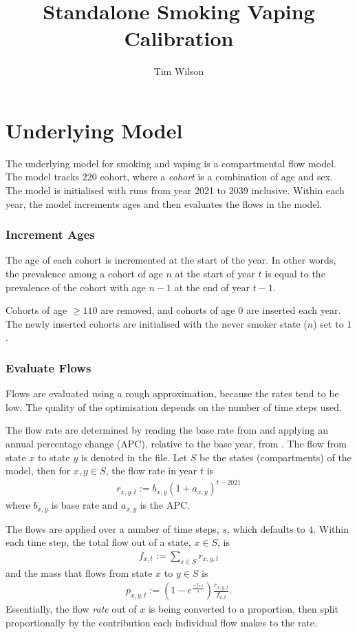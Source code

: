 \documentclass[]{article}
\title{Standalone Smoking Vaping Calibration}
\author{Tim Wilson}
\begin{document}
	
	\maketitle
	
	\section{Underlying Model}
	
	The underlying model for smoking and vaping is a compartmental flow model. The model tracks $220$ cohort, where a \emph{cohort} is a combination of age and sex. The model is initialised with  runs from year 2021 to 2039 inclusive. Within each year, the model increments ages and then evaluates the flows in the model.
	
	\subsubsection{Increment Ages}
	The age of each cohort is incremented at the start of the year. In other words, the prevalence among a cohort of age $n$ at the start of year $t$ is equal to the prevalence of the cohort with age $n-1$ at the end of year $t-1$.
	
	Cohorts of age $\geq 110$ are removed, and cohorts of age $0$ are inserted each year. The newly inserted cohorts are initialised with the never smoker state ($n$) set to $1$.
	
	\subsubsection{Evaluate Flows}
	
	Flows are evaluated using a rough approximation, because the rates tend to be low. The quality of the optimisation depends on the number of time steps used.
	
	The flow rate are determined by reading the base rate from  and applying an annual percentage change (APC), relative to the base year, from . The flow from state $x$ to state $y$ is denoted  in the file. Let $S$ be the states (compartments) of the model, then for $x,y \in S$, the flow rate in year $t$ is
	\begin{align*}
		r_{x, y, t} := b_{x,y} (1 + a_{x,y})^{t - 2021}
	\end{align*}
	where $b_{x, y}$ is base rate and $a_{x,y}$ is the APC.
	
	The flows are applied over a number of time steps, $s$, which defaults to $4$. Within each time step, the total flow out of a state, $x \in S$, is
	\begin{align*}
		f_{x, t} := \sum_{s \in S} r_{x, y, t}
	\end{align*}
	and the mass that flows from state $x$ to $y \in S$ is
	\begin{align*}
		p_{x, y, t} :=\left(1 - e^\frac{-f_{x, t}}{s}\right) \frac{r_{x, y, t}}{f_{x, t}}.
	\end{align*}
	Essentially, the flow \emph{rate} out of $x$ is being converted to a proportion, then split proportionally by the contribution each individual flow makes to the rate.
	
\end{document}
